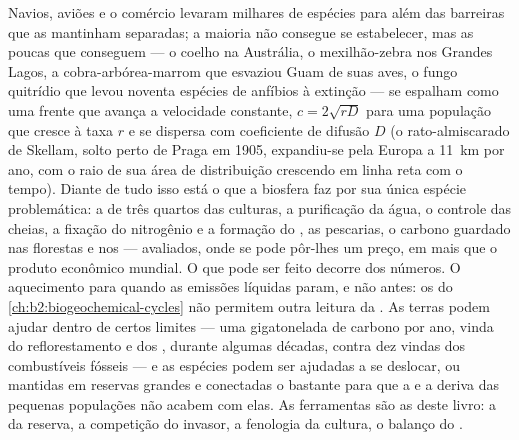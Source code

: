 \begin{proposition}\label{prop:b2:global-change:invasion}
Navios, aviões e o comércio levaram milhares de espécies para além das
barreiras que as mantinham separadas; a maioria não consegue se
estabelecer, mas as poucas que conseguem --- o coelho na Austrália, o
mexilhão-zebra nos Grandes Lagos, a cobra-arbórea-marrom que esvaziou
Guam de suas aves, o fungo quitrídio que levou noventa espécies de
anfíbios à extinção --- se espalham como uma frente que avança a
velocidade constante, $c =
2\sqrt{rD}$ para uma população que cresce à taxa $r$ e se dispersa
com coeficiente de difusão $D$ (o rato-almiscarado de Skellam, solto
perto de Praga em 1905, expandiu-se pela Europa a \qty{11}{km} por ano,
com o raio de sua área de distribuição crescendo em linha reta com o
tempo). Diante de tudo isso está o que a biosfera faz por sua única
espécie problemática: a  de três quartos das culturas, a
purificação da água, o controle das cheias, a fixação do nitrogênio e a
formação do , as pescarias, o carbono guardado nas florestas e nos
 --- \emph{} avaliados, onde se pode
pôr-lhes um preço, em mais que o produto econômico mundial. O que pode
ser feito decorre dos números. O aquecimento para quando as emissões
líquidas param, e não antes: os  do
\cref{ch:b2:biogeochemical-cycles} não permitem outra leitura da
\emph{}. As terras podem ajudar dentro de certos
limites --- uma gigatonelada de carbono por ano, vinda do
reflorestamento e dos , durante algumas décadas, contra dez vindas
dos combustíveis fósseis --- e as espécies podem ser ajudadas a se
deslocar, ou mantidas em reservas grandes e conectadas o bastante para
que a  e a deriva das pequenas populações não
acabem com elas. As ferramentas são as deste livro: a  da reserva, a competição do invasor, a fenologia da cultura,
o balanço do .
\end{proposition}


